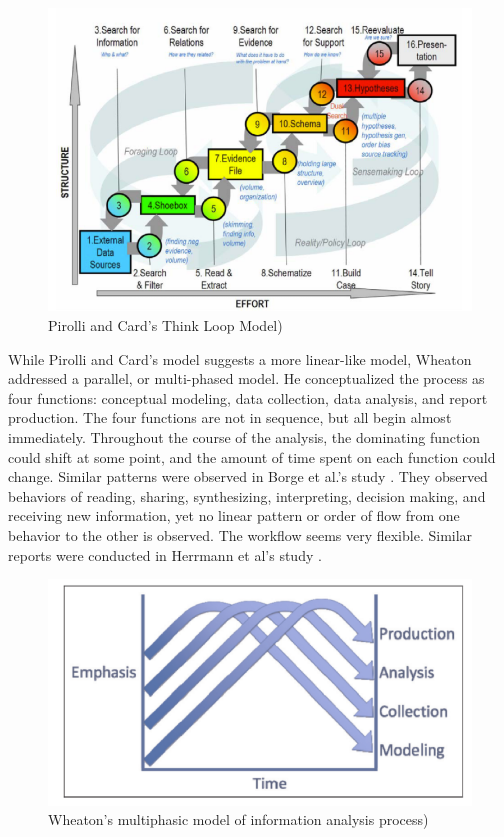 \begin{figure}
	\centering
	\includegraphics[width=.8\columnwidth]{02-Literature/img/pirolli.png}
	\caption{Pirolli and Card's Think Loop Model)\label{fig:pirolli}}
\end{figure}

While Pirolli and Card's model suggests a more linear-like model, Wheaton \citep{Wheaton2011} addressed a 
parallel, or multi-phased model. He conceptualized the process as four functions: conceptual modeling, data collection, data analysis, and report production. The four functions are not in sequence, but all begin almost immediately. Throughout the course of the analysis, the dominating function could shift at some point, and the amount of time spent on each function could change. Similar patterns were observed in Borge et al.'s study \citep{Borge2012}. They observed behaviors of reading, sharing, synthesizing, interpreting, decision making, and receiving new information, yet no linear pattern or order of flow from one behavior to the other is observed. The workflow seems very flexible. Similar reports were conducted in Herrmann et al's study \citep{Herrmann2013a}.

\begin{figure}
	\centering
	\includegraphics[width=\columnwidth]{02-Literature/img/wheaton.png}
	\caption{Wheaton's multiphasic model of information analysis process)\label{fig:wheaton}}
\end{figure}

